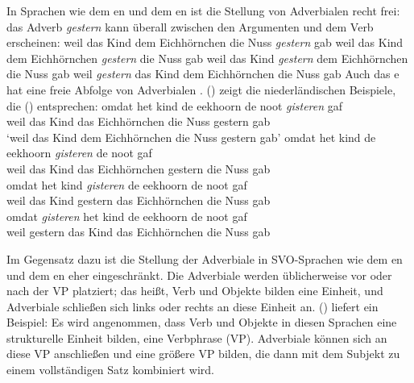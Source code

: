 In Sprachen wie dem en und dem en ist die Stellung von Adverbialen recht frei: das Adverb \emph{gestern}
kann überall zwischen den Argumenten und dem Verb erscheinen:
\eal
\ex
weil das Kind dem Eichhörnchen die Nuss \emph{gestern} gab
\ex
weil das Kind dem Eichhörnchen \emph{gestern} die Nuss gab
\ex
weil das Kind \emph{gestern} dem Eichhörnchen die Nuss gab
\ex
weil \emph{gestern} das Kind dem Eichhörnchen die Nuss gab
\zl
Auch das e hat eine freie Abfolge von Adverbialen \parencites[]{Neeleman94b-u}[]{Koster99a-u}[Abschnitt~6]{Bouma2003a-u}. () zeigt die niederländischen Beispiele, die
() entsprechen:
\eal
\ex
\gll omdat het kind de eekhoorn de noot \emph{gisteren} gaf\\
     weil das Kind das Eichhörnchen die Nuss gestern gab\\\dutchshort
\glt `weil das Kind dem Eichhörnchen die Nuss gestern gab'
\ex
\gll omdat het kind de eekhoorn \emph{gisteren} de noot gaf\\
     weil das Kind das Eichhörnchen gestern die Nuss gab\\
\ex
\gll omdat het kind \emph{gisteren} de eekhoorn de noot gaf\\
     weil das Kind gestern das Eichhörnchen die Nuss gab\\
\ex
\gll omdat \emph{gisteren} het kind de eekhoorn de noot gaf\\
     weil gestern das Kind das Eichhörnchen die Nuss gab\\
\zl

\noindent
Im Gegensatz dazu ist die Stellung der Adverbiale in SVO-Sprachen wie dem en und dem
en eher eingeschränkt. Die Adverbiale werden üblicherweise vor oder nach der VP platziert; das heißt, Verb und Objekte bilden eine
Einheit, und Adverbiale schließen sich links oder rechts an diese Einheit an. () liefert ein Beispiel:
\eal
{}
\zl
Es wird angenommen, dass Verb und Objekte in diesen Sprachen eine strukturelle Einheit bilden, eine Verbphrase (VP). Adverbiale können
sich an diese VP anschließen und eine größere VP bilden, die dann mit dem Subjekt zu einem vollständigen Satz kombiniert wird.

